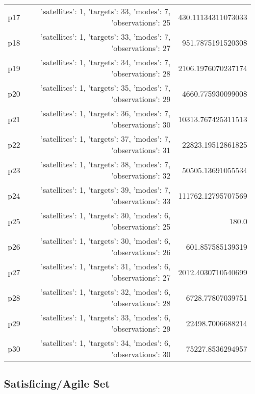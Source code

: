 \documentclass{article}
\begin{document}
\begin{center}
\begin{tabular}{r|r|r}
  p17&{'satellites': 1, 'targets': 33, 'modes': 7, 'observations': 25}&430.11134311073033\\
  p18&{'satellites': 1, 'targets': 33, 'modes': 7, 'observations': 27}&951.7875191520308\\
  p19&{'satellites': 1, 'targets': 34, 'modes': 7, 'observations': 28}&2106.1976070237174\\
  p20&{'satellites': 1, 'targets': 35, 'modes': 7, 'observations': 29}&4660.775930099008\\
  p21&{'satellites': 1, 'targets': 36, 'modes': 7, 'observations': 30}&10313.767425311513\\
  p22&{'satellites': 1, 'targets': 37, 'modes': 7, 'observations': 31}&22823.19512861825\\
  p23&{'satellites': 1, 'targets': 38, 'modes': 7, 'observations': 32}&50505.13691055534\\
  p24&{'satellites': 1, 'targets': 39, 'modes': 7, 'observations': 33}&111762.12795707569\\
  p25&{'satellites': 1, 'targets': 30, 'modes': 6, 'observations': 25}&180.0\\
  p26&{'satellites': 1, 'targets': 30, 'modes': 6, 'observations': 26}&601.857585139319\\
  p27&{'satellites': 1, 'targets': 31, 'modes': 6, 'observations': 27}&2012.4030710540699\\
  p28&{'satellites': 1, 'targets': 32, 'modes': 6, 'observations': 28}&6728.77807039751\\
  p29&{'satellites': 1, 'targets': 33, 'modes': 6, 'observations': 29}&22498.7006688214\\
  p30&{'satellites': 1, 'targets': 34, 'modes': 6, 'observations': 30}&75227.8536294957
                            \end{tabular}
                            \end{center}
                    

                                \subsection*{Satisficing/Agile Set}
                                
\end{document}
